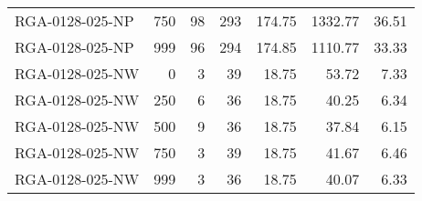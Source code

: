 \begin{table}[htbp]
{\begin{tabular}{lrrrrrr}
    RGA-0128-025-NP & 750    & 98     & 293    & 174.75 & 1332.77 & 36.51 \\
    RGA-0128-025-NP & 999    & 96     & 294    & 174.85 & 1110.77 & 33.33 \\ \hline
    RGA-0128-025-NW & 0      & 3      & 39     & 18.75  & 53.72  & 7.33 \\
    RGA-0128-025-NW & 250    & 6      & 36     & 18.75  & 40.25  & 6.34 \\
    RGA-0128-025-NW & 500    & 9      & 36     & 18.75  & 37.84  & 6.15 \\
    RGA-0128-025-NW & 750    & 3      & 39     & 18.75  & 41.67  & 6.46 \\
    RGA-0128-025-NW & 999    & 3      & 36     & 18.75  & 40.07  & 6.33 \\ \hline
    \bottomrule
    \end{tabular}}
  \label{tab:addlabel}%
\end{table}%
